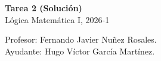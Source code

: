 \documentclass[letterpaper,DIV=15,headsepline,12pt]{scrartcl}
\begin{document}
    \thispagestyle{beginstyle}
    \begin{center}
        {\fontsize{30}{60}\rmfamily \textbf{Tarea 2 (Solución)}} \\ \vspace{.2cm}
        Lógica Matemática I, 2026-1
    \end{center}
    \begin{flushright}
        \footnotesize \hfill Profesor: Fernando Javier Nuñez Rosales.\\
        \hfill Ayudante: Hugo Víctor García Martínez.
    \end{flushright}
\end{document}
